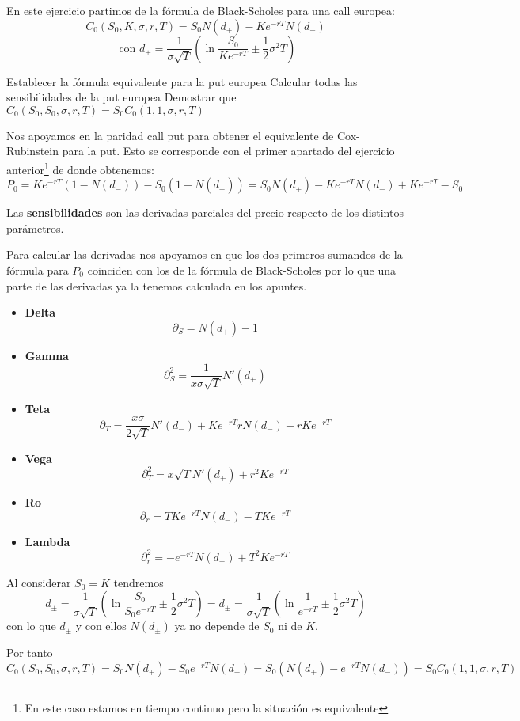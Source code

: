 \begin{problem}[2]
En este ejercicio partimos de la fórmula de Black-Scholes para una call europea:
\[C_0(S_0,K,σ,r,T)=S_0N(d_+)-Ke^{-rT}N(d_-) \]
\[\text{   con } d_{\pm} = \frac{1}{σ\sqrt{T}}\left( \ln \frac{S_0}{Ke^{-rT}}\pm \frac{1}{2}σ^2T\right)\]

\ppart Establecer la fórmula equivalente para la put europea
\ppart Calcular todas las sensibilidades de la put europea
\ppart Demostrar que $C_0(S_0,S_0,σ,r,T)=S_0C_0(1,1,σ,r,T)$
\solution
{}

\spart

Nos apoyamos en la paridad call put para obtener el equivalente de Cox-Rubinstein para la put. Esto se corresponde con el primer apartado del ejercicio anterior\footnote{En este caso estamos en tiempo continuo pero la situación es equivalente} de donde obtenemos:
\[P_0 = Ke^{-rT}(1-N(d_-))-S_0(1-N(d_+)) = S_0N(d_+) -Ke^{-rT}N(d_-)+Ke^{-rT} -S_0 \]

\spart

Las \textbf{sensibilidades} son las derivadas parciales del precio respecto de los distintos parámetros.

Para calcular las derivadas nos apoyamos en que los dos primeros sumandos de la fórmula para $P_0$ coinciden con los de la fórmula de Black-Scholes por lo que una parte de las derivadas ya la tenemos calculada en los apuntes.
\begin{itemize}
\item \textbf{Delta}
\[\partial_S = N(d_+)-1\]
\item \textbf{Gamma}
\[\partial^2_S = \frac{1}{xσ\sqrt{T}}N'(d_+)\]
\item \textbf{Teta}
\[\partial_T = \frac{xσ}{2\sqrt{T}}N'(d_-) + Ke^{-rT}rN(d_-)-rKe^{-rT}\]
\item \textbf{Vega}
\[\partial^2_T = x\sqrt{T}N'(d_+)+r^2Ke^{-rT}\]
\item \textbf{Ro}
\[\partial_r = TKe^{-rT}N(d_-)-TKe^{-rT}\]
\item \textbf{Lambda}
\[\partial^2_r = -e^{-rT}N(d_-)+T^2Ke^{-rT}\]
\end{itemize}

\spart

Al considerar $S_0=K$ tendremos
\[d_{\pm} = \frac{1}{σ\sqrt{T}}\left( \ln \frac{S_0}{S_0e^{-rT}}\pm \frac{1}{2}σ^2T\right) = d_{\pm} = \frac{1}{σ\sqrt{T}}\left( \ln \frac{1}{e^{-rT}}\pm \frac{1}{2}σ^2T\right)\]
con lo que $d_{\pm}$ y con ellos $N(d_{\pm})$ ya no depende de $S_0$ ni de $K$.

Por tanto
\[C_0(S_0,S_0,σ,r,T) = S_0N(d_+)-S_0e^{-rT}N(d_-) = S_0\left(N(d_+)-e^{-rT}N(d_-) \right) = S_0 C_0(1,1,σ,r,T)\]
\end{problem}

